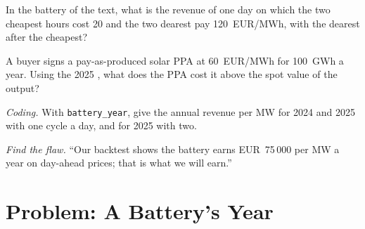 \begin{exercise}[$\star\star$]\label{exo:m3:power-markets-trading:5}
In the battery of the text, what is the revenue of one day on which the two cheapest hours cost
\qty{20}{} and the two dearest pay \qty{120}{EUR/MWh}, with the dearest after the cheapest?
\end{exercise}

\begin{exercise}[$\star\star$]\label{exo:m3:power-markets-trading:6}
A buyer signs a pay-as-produced solar PPA at \qty{60}{EUR/MWh} for 100~GWh a year. Using the 2025
, what does the PPA cost it above the spot value of the output?
\end{exercise}

\begin{exercise}[$\star\star\star$]\label{exo:m3:power-markets-trading:7}
\emph{Coding.} With \texttt{battery\_year}, give the annual revenue per MW for 2024 and 2025 with
one cycle a day, and for 2025 with two.
\end{exercise}

\begin{exercise}[$\star\star\star$]\label{exo:m3:power-markets-trading:8}
\emph{Find the flaw.} ``Our backtest shows the battery earns EUR~75\,000 per MW a year on
day-ahead prices; that is what we will earn.''
\end{exercise}

\section{Problem: A Battery's Year}

